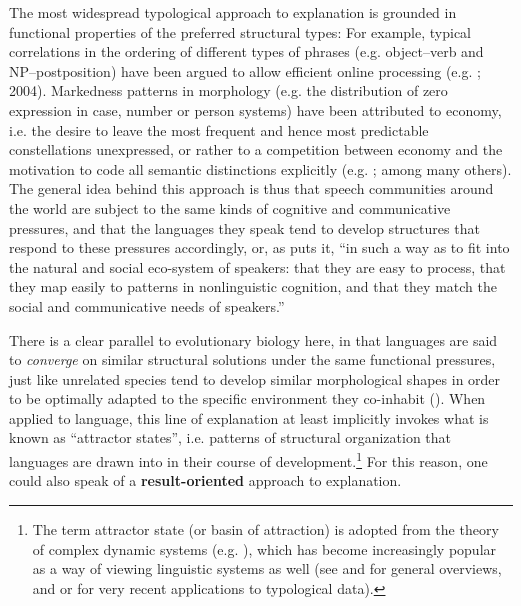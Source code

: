 \documentclass[output=paper]{langsci/langscibook}
\begin{document}
The most widespread typological approach to explanation is grounded in functional properties of the preferred structural types: For example, typical correlations in the ordering of different types of phrases (e.g. object–verb and NP–postposition) have been argued to allow efficient online processing (e.g. \citealt{Hawkins1994}; 2004). Markedness patterns in morphology (e.g. the distribution of zero expression in case, number or person systems) have been attributed to economy, i.e. the desire to leave the most frequent and hence most predictable constellations unexpressed, or rather to a competition between economy and the motivation to code all semantic distinctions explicitly (e.g. \citealt{Haiman1983,Comrie1989,Aissen2003,Croft2003,Haspelmath2008_Econ}; among many others). The general idea behind this approach is thus that speech communities around the world are subject to the same kinds of cognitive and communicative pressures, and that the languages they speak tend to develop structures that respond to these pressures accordingly, or, as \citet[118]{Bickel2014} puts it, “in such a way as to fit into the natural and social eco-system of speakers: that they are easy to process, that they map easily to patterns in nonlinguistic cognition, and that they match the social and communicative needs of speakers.” 

There is a clear parallel to evolutionary biology here, in that languages are said to \textit{converge} on similar structural solutions under the same functional pressures, just like unrelated species tend to develop similar morphological shapes in order to be optimally adapted to the specific environment they co-inhabit (\citealt{Deacon1997,Caldwell2008,EvansLevinson2009,Givón2010}). When applied to language, this line of explanation at least implicitly invokes what is known as “attractor states”, i.e. patterns of structural organization that languages are drawn into in their course of development.\footnote{The term attractor state (or basin of attraction) is adopted from the theory of complex dynamic systems (e.g.  \citealt{Cooper1999,HoweLewis2005,Holland2006}), which has become increasingly popular as a way of viewing linguistic systems as well (see \citealt{BecknerEtAl2009} and \citealt{Port2009} for general overviews, and \citealt{Haig2018} or \citealt{Nichols2018} for very recent applications to typological data).} For this reason, one could also speak of a \textbf{result-oriented} approach to explanation. 
\end{document}
